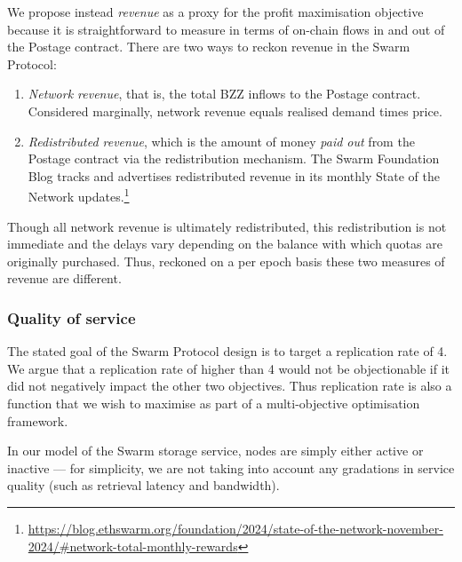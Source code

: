 We propose instead \emph{revenue} as a proxy for the profit maximisation objective because it is straightforward to measure in terms of on-chain flows in and out of the Postage contract.
%
There are two ways to reckon revenue in the Swarm Protocol:
\begin{enumerate}
  \item 
    \emph{Network revenue}, that is, the total BZZ inflows to the Postage contract. 
    Considered marginally, network revenue equals realised demand times price.

  \item 
    \emph{Redistributed revenue}, which is the amount of money \emph{paid out} from the Postage contract via the redistribution mechanism.
    The Swarm Foundation Blog tracks and advertises redistributed revenue in its monthly State of the Network updates.\footnote{\url{https://blog.ethswarm.org/foundation/2024/state-of-the-network-november-2024/\#network-total-monthly-rewards}}

\end{enumerate}
%
Though all network revenue is ultimately redistributed, this redistribution is not immediate and the delays vary depending on the balance with which quotas are originally purchased.
%
Thus, reckoned on a per epoch basis these two measures of revenue are different.

\subsubsection{Quality of service}

The stated goal of the Swarm Protocol design is to target a replication rate of 4.
%
We argue that a replication rate of higher than 4 would not be objectionable if it did not negatively impact the other two objectives.
%
Thus replication rate is also a function that we wish to maximise as part of a multi-objective optimisation framework.

In our model of the Swarm storage service, nodes are simply either active or inactive --- for simplicity, we are not taking into account any gradations in service quality (such as retrieval latency and bandwidth).

